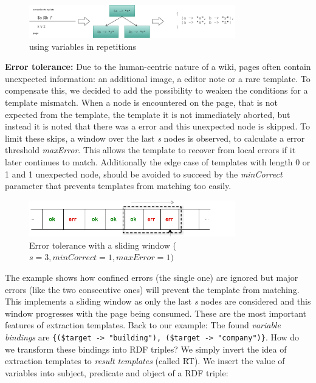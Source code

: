 \begin{figure}[htbp]
\centering
\includegraphics[width=0.8\textwidth]{../images/varlist}
\caption{using variables in repetitions}
\label{fig:varlist}
\end{figure}\newline
\textbf{Error tolerance:}
Due to the human-centric nature of a wiki, pages often contain unexpected information: an additional image, a editor note or a rare template. 
To compensate this, we decided to add the possibility to weaken the conditions for a template mismatch. 
When a node is encountered on the page, that is not expected from the template, the template it is not immediately aborted, but instead it is noted that there was a error and this unexpected node is skipped. 
To limit these skips, a window over the last \textit{s} nodes is observed, to calculate a error threshold \textit{maxError}. 
This allows the template to recover from local errors if it later continues to match. 
Additionally the edge case of templates with length 0 or 1 and 1 unexpected node, should be avoided to succeed by the \textit{minCorrect} parameter that prevents templates from matching too easily.
\begin{figure}[h]
\centering
\includegraphics[width=0.8\textwidth]{../images/sliding}
\caption{Error tolerance with a sliding window ($\textit{s}=3, \textit{minCorrect}=1, \textit{maxError}=1)$}
\label{fig:sliding}
\end{figure}
The example shows how confined errors (the single one) are ignored but major errors (like the two consecutive ones) will prevent the template from matching.
This implements a sliding window as only the last \textit{s} nodes are considered and this window progresses with the page being consumed.\newline
These are the most important features of extraction templates.\newline
Back to our example:
The found \textit{variable bindings} are \texttt{\{(\$target -> "building"), (\$target -> "company")\}}. 
How do we transform these bindings into RDF triples? We simply invert the idea of extraction templates to \textit{result templates} (called RT). We insert the value of variables into subject, predicate and object of a RDF triple:
